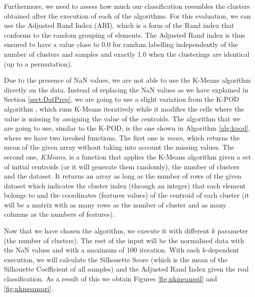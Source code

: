 Furthermore, we need to assess how much our classification resembles the clusters obtained after the execution of each of the algorithms. For this evaluation, we can use the Adjusted Rand Index (ARI), which is a form of the Rand index \citep{rand1971objective} that conforms to the random grouping of elements. The Adjusted Rand index is thus ensured to have a value close to 0.0 for random labelling independently of the number of clusters and samples and exactly 1.0 when the clusterings are identical (up to a permutation).

Due to the presence of NaN values, we are not able to use the K-Means algorithm directly on the data. Instead of replacing the NaN values as we have explained in Section \ref{sect:DatPrep}, we are going to use a slight variation from the K-POD algorithm \citep{chi2016k}, which runs K-Means iteratively while it modifies the cells where the value is missing by assigning the value of the centroids. The algorithm that we are going to use, similar to the K-POD, is the one shown in Algorithm \ref{alg:kpod}, where we have two invoked functions. The first one is \textit{mean}, which returns the mean of the given array without taking into account the missing values. The second one, \textit{KMeans}, is a function that applies the K-Means algorithm given a set of initial centroids (or it will generate them randomly), the number of clusters and the dataset. It returns an array as long as the number of rows of the given dataset which indicates the cluster index (through an integer) that each element belongs to and the coordinates (features values) of the centroid of each cluster (it will be a matrix with as many rows as the number of cluster and as many columns as the numbers of features).

Now that we have chosen the algorithm, we execute it with different $k$ parameter (the number of clusters). The rest of the input will be the normalised data with the NaN values and with a maximum of 100 iteration. With each $k$-dependent execution, we will calculate the Silhouette Score (which is the mean of the Silhouette Coefficient of all samples) and the Adjusted Rand Index given the real classification. As a result of this we obtain Figures \ref{fig:nkmeanssil} and \ref{fig:nkmeansari}.

